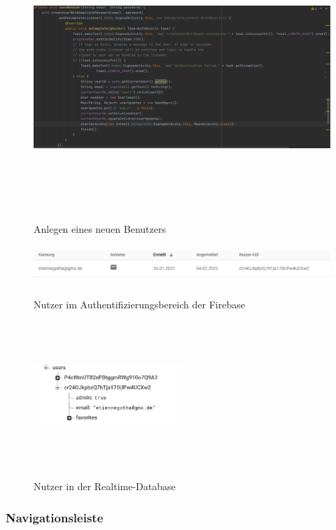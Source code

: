 \documentclass[12pt, a4paper, oneside]{article}
\begin{document}
\begin{figure}
\includegraphics[width=1\textwidth, height=10cm]{save_user.png}
\centering
\label{new_user}
\caption{Anlegen eines neuen Benutzers}
\end{figure}
\begin{figure}
\includegraphics[width=1\textwidth, height=1.5cm]{User_In_Auth.png}
\centering
\label{auth_user}
\caption{Nutzer im Authentifizierungsbereich der Firebase}
\end{figure}
\begin{figure}
\includegraphics[width=0.5\textwidth, height=5.5cm]{User_Rtdb.png}
\centering
\label{user_rtdb}
\caption{Nutzer in der Realtime-Database}
\end{figure}
\subsubsection{Navigationsleiste}
\end{document}
